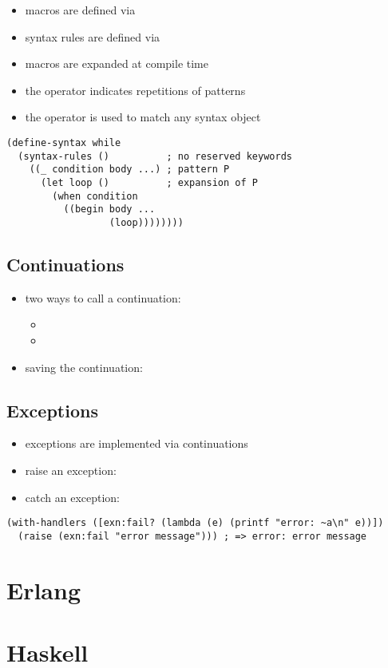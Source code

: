 \documentclass[a4paper,landscape,10pt]{article}
\begin{document}
\begin{multicols*}{2}
  \begin{itemize}
    \item macros are defined via 
    \item syntax rules are defined via 
    \item macros are expanded at compile time
    \item the  operator indicates repetitions of patterns
    \item the \iracket{_} operator is used to match any syntax object
  \end{itemize}

  \begin{lstlisting}[language=Racket]
(define-syntax while
  (syntax-rules ()          ; no reserved keywords
    ((_ condition body ...) ; pattern P
      (let loop ()          ; expansion of P
        (when condition
          ((begin body ...
                  (loop))))))))
  \end{lstlisting}

  \subsection{Continuations}

  \begin{itemize}
    \item two ways to call a continuation:
          \begin{itemize}
            \item {}
            \item {}
          \end{itemize}
    \item saving the continuation: 
  \end{itemize}

  \subsection{Exceptions}

  \begin{itemize}
    \item exceptions are implemented via continuations
    \item raise an exception: 
    \item catch an exception: 
  \end{itemize}

  \begin{lstlisting}[language=Racket]
(with-handlers ([exn:fail? (lambda (e) (printf "error: ~a\n" e))])
  (raise (exn:fail "error message"))) ; => error: error message
  \end{lstlisting}

\end{multicols*}

\clearpage

\section{Erlang}

\clearpage

\section{Haskell}
\end{document}

